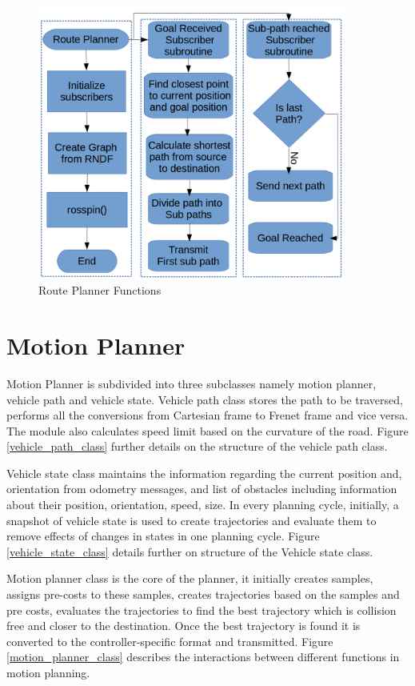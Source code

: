 \begin{figure}
	\centering
	\includegraphics[width=0.9\textwidth]{Images/implementation/route_planner.png}
	\caption{Route Planner Functions}
	\label{route_planner_func}
\end{figure}

\section{Motion Planner}
Motion Planner is subdivided into three subclasses namely motion planner, vehicle path and vehicle state. Vehicle path class stores the path to be traversed, performs all the conversions from Cartesian frame to Frenet frame and vice versa. The module also calculates speed limit based on the curvature of the road. Figure \ref{vehicle_path_class} further details on the structure of the vehicle path class. 

Vehicle state class maintains the information regarding the current position and, orientation from odometry messages, and list of obstacles including information about their position, orientation, speed, size. In every planning cycle, initially, a snapshot of vehicle state is used to create trajectories and evaluate them to remove effects of changes in states in one planning cycle. Figure \ref{vehicle_state_class} details further on structure of the Vehicle state class. 


Motion planner class is the core of the planner, it initially creates samples, assigns pre-costs to these samples, creates trajectories based on the samples and pre costs, evaluates the trajectories to find the best trajectory which is collision free and closer to the destination. Once the best trajectory is found it is converted to the controller-specific format and transmitted. Figure \ref{motion_planner_class} describes the interactions between different functions in motion planning.


